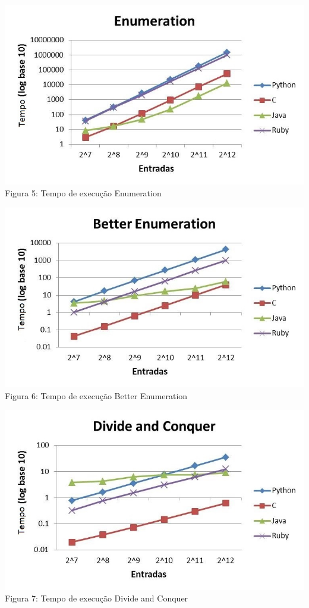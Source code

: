 \documentclass[
	12pt,				%
	oneside,   	        %
	a4paper,			%
	english,			%
	french,				%
	spanish,			%
	brazil,				%
	]{pacotes/abntex2}
\begin{document}

\begin{center}
    \includegraphics[scale=0.9]{figuras/enumeration.jpg} \\
    \caption{Figura 5: Tempo de execução Enumeration}
\end{center}

\begin{center}
    \includegraphics[scale=0.9]{figuras/better-enumeration.jpg} \\
    \caption{Figura 6: Tempo de execução Better Enumeration}
\end{center}

\begin{center} 
    \includegraphics[scale=0.9]{figuras/divide-conquer.jpg} \\
    \caption{Figura 7: Tempo de execução Divide and Conquer}
\end{center}
\end{document}
